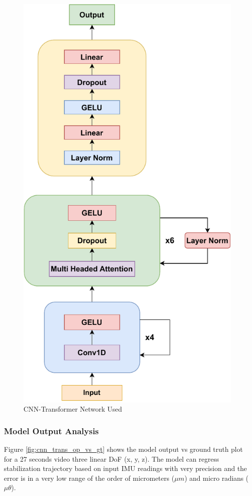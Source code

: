 \begin{figure}[H]
    \centering
    \includegraphics[scale=0.8]{images/fig_chapter2/nns/transformer_mt.pdf}
    \caption{CNN-Transformer Network Used}
    \label{fig:cnn_transformer_used}
\end{figure}

\subsubsection{Model Output Analysis}
Figure \ref{fig:cnn_trans_op_vs_gt} shows the model output vs ground truth plot for a 27 seconds video three linear DoF (x, y, z). The model can regress stabilization trajectory based on input IMU readings with very precision and the error is in a very low range of the order of micrometers ($ \mu m $) and micro radians ($ \mu \theta $).

